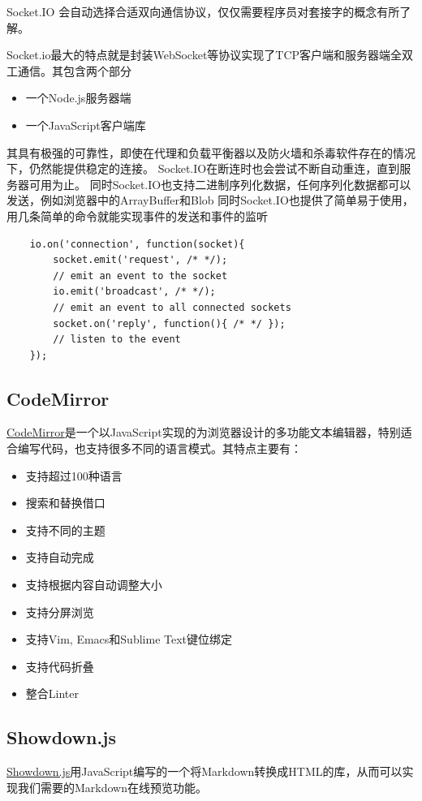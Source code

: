 \documentclass[11pt]{ctexart}
\begin{document}
Socket.IO 会自动选择合适双向通信协议，仅仅需要程序员对套接字的概念有所了解。

Socket.io最大的特点就是封装WebSocket等协议实现了TCP客户端和服务器端全双工通信。其包含两个部分
\begin{itemize}
	\item 一个Node.js服务器端
	\item 一个JavaScript客户端库
\end{itemize}
其具有极强的可靠性，即使在代理和负载平衡器以及防火墙和杀毒软件存在的情况下，仍然能提供稳定的连接。
Socket.IO在断连时也会尝试不断自动重连，直到服务器可用为止。
同时Socket.IO也支持二进制序列化数据，任何序列化数据都可以发送，例如浏览器中的ArrayBuffer和Blob
同时Socket.IO也提供了简单易于使用，用几条简单的命令就能实现事件的发送和事件的监听
\begin{verbatim}
    io.on('connection', function(socket){
        socket.emit('request', /* */);
        // emit an event to the socket
        io.emit('broadcast', /* */);
        // emit an event to all connected sockets
        socket.on('reply', function(){ /* */ }); 
        // listen to the event
    });
\end{verbatim}
\subsection{CodeMirror}
\href{http://codemirror.net/}{CodeMirror}是一个以JavaScript实现的为浏览器设计的多功能文本编辑器，特别适合编写代码，也支持很多不同的语言模式。其特点主要有：
\begin{itemize}
	\item 支持超过100种语言
	\item 搜索和替换借口
	\item 支持不同的主题
	\item 支持自动完成
	\item 支持根据内容自动调整大小
	\item 支持分屏浏览
	\item 支持Vim, Emacs和Sublime Text键位绑定
	\item 支持代码折叠
	\item 整合Linter 
\end{itemize}
\subsection{Showdown.js}
\href{http://showdownjs.com/}{Showdown.js}用JavaScript编写的一个将Markdown转换成HTML的库，从而可以实现我们需要的Markdown在线预览功能。
\end{document}
